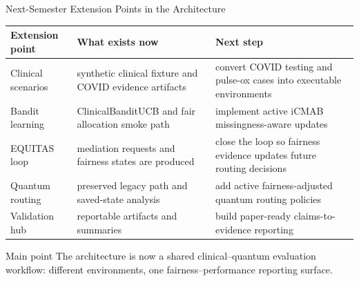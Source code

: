 \begin{frame}{Next-Semester Extension Points in the Architecture}
\small
\begin{tabular}{p{}p{}p{}}
\toprule
\textbf{Extension point} & \textbf{What exists now} & \textbf{Next step} \\
\midrule
Clinical scenarios & synthetic clinical fixture and COVID evidence artifacts & convert COVID testing and pulse-ox cases into executable environments \\
Bandit learning & ClinicalBanditUCB and fair allocation smoke path & implement active iCMAB missingness-aware updates \\
EQUITAS loop & mediation requests and fairness states are produced & close the loop so fairness evidence updates future routing decisions \\
Quantum routing & preserved legacy path and saved-state analysis & add active fairness-adjusted quantum routing policies \\
Validation hub & reportable artifacts and summaries & build paper-ready claims-to-evidence reporting \\
\bottomrule
\end{tabular}

\vspace{0.6em}
\begin{block}{Main point}
The architecture is now a shared clinical--quantum evaluation workflow: different environments, one fairness--performance reporting surface.
\end{block}
\end{frame}
